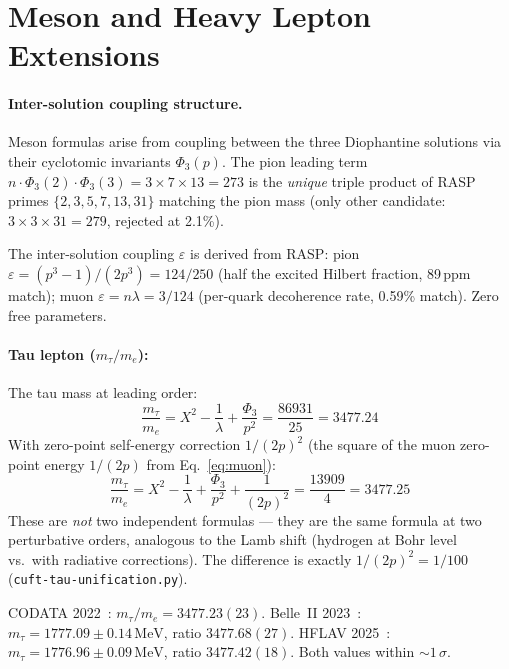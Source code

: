 \documentclass[12pt,a4paper]{article}
\theoremstyle{definition}
\newcommand{\Phithree}{\Phi_3}
\newcommand{\MeV}{\,\mathrm{MeV}}
\begin{document}
\section{Meson and Heavy Lepton Extensions}

\paragraph{Inter-solution coupling structure.}
Meson formulas arise from coupling between the three Diophantine
solutions via their cyclotomic invariants $\Phithree(p)$. The pion
leading term $n \cdot \Phithree(2) \cdot \Phithree(3) = 3 \times 7
\times 13 = 273$ is the \emph{unique} triple product of RASP primes
$\{2,3,5,7,13,31\}$ matching the pion mass (only other candidate:
$3 \times 3 \times 31 = 279$, rejected at 2.1\%).

The inter-solution coupling $\varepsilon$ is derived from RASP:
pion $\varepsilon = (p^3{-}1)/(2p^3) = 124/250$ (half the excited
Hilbert fraction, 89\,ppm match); muon $\varepsilon = n\lambda = 3/124$
(per-quark decoherence rate, 0.59\% match). Zero free parameters.

\paragraph{Tau lepton ($m_\tau/m_e$):}
The tau mass at leading order:
\begin{equation}\label{eq:tau-leading}
  \frac{m_\tau}{m_e} = X^2 - \frac{1}{\lambda} + \frac{\Phithree}{p^2}
  = \frac{86931}{25} = 3477.24
\end{equation}
With zero-point self-energy correction $1/(2p)^2$ (the square of the muon
zero-point energy $1/(2p)$ from Eq.~\eqref{eq:muon}):
\begin{equation}\label{eq:tau}
  \frac{m_\tau}{m_e} = X^2 - \frac{1}{\lambda} + \frac{\Phithree}{p^2}
  + \frac{1}{(2p)^2} = \frac{13909}{4} = 3477.25
\end{equation}
These are \emph{not} two independent formulas --- they are the same formula
at two perturbative orders, analogous to the Lamb shift (hydrogen at Bohr
level vs.\ with radiative corrections). The difference is exactly
$1/(2p)^2 = 1/100$ (\texttt{cuft-tau-unification.py}).

CODATA 2022~\cite{codata2022}: $m_\tau/m_e = 3477.23(23)$.
Belle~II 2023~\cite{belleII2023}: $m_\tau = 1777.09 \pm 0.14\MeV$,
ratio $3477.68(27)$.
HFLAV 2025~\cite{hflav2025}: $m_\tau = 1776.96 \pm 0.09\MeV$,
ratio $3477.42(18)$. Both values within ${\sim}1\,\sigma$.
\end{document}
